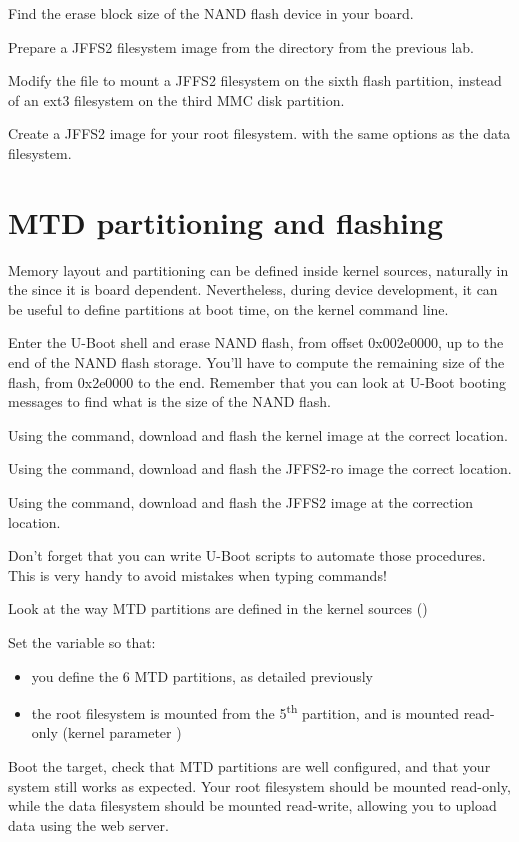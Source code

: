 Find the erase block size of the NAND flash device in your board.

Prepare a JFFS2 filesystem image from the 
directory from the previous lab.

Modify the  file to mount a JFFS2 filesystem on
the sixth flash partition, instead of an ext3 filesystem on the third
MMC disk partition.

Create a JFFS2 image for your root filesystem. with the same options
as the data filesystem.

\section{MTD partitioning and flashing}

Memory layout and partitioning can be defined inside kernel sources,
naturally in the  since it is
board dependent. Nevertheless, during device development, it can be
useful to define partitions at boot time, on the kernel command line.

Enter the U-Boot shell and erase NAND flash, from offset 0x002e0000,
up to the end of the NAND flash storage. You'll have to compute the
remaining size of the flash, from 0x2e0000 to the end. Remember that
you can look at U-Boot booting messages to find what is the size of
the NAND flash.

Using the  command, download and flash the kernel image at
the correct location.

Using the  command, download and flash the JFFS2-ro image
the correct location.

Using the  command, download and flash the JFFS2 image at
the correction location.

Don't forget that you can write U-Boot scripts to automate those
procedures. This is very handy to avoid mistakes when typing commands!

Look at the way MTD partitions are defined in the kernel sources
()

Set the  variable so that:

\begin{itemize}
\item you define the 6 MTD partitions, as detailed previously
\item the root filesystem is mounted from the 5\textsuperscript{th}
  partition, and is mounted read-only (kernel parameter )
\end{itemize}

Boot the target, check that MTD partitions are well configured, and
that your system still works as expected. Your root filesystem should
be mounted read-only, while the data filesystem should be mounted
read-write, allowing you to upload data using the web server.
